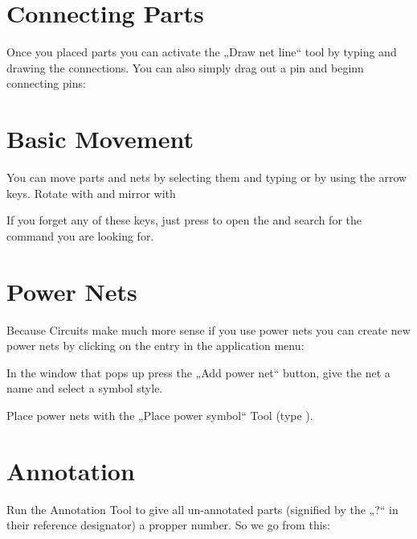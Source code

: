 \documentclass[letterpaper,10pt,czech]{sphinxmanual}
\begin{document}
\noindent{}


\section{Connecting Parts}
\label{\detokenize{draw-schematic:connecting-parts}}
Once you placed parts you can activate the „Draw net line“ tool by typing  and drawing the connections. You can also simply drag out a pin and beginn connecting pins:

\noindent{}


\section{Basic Movement}
\label{\detokenize{draw-schematic:basic-movement}}
You can move parts and nets by selecting them and typing  or by using the  arrow keys. Rotate with  and mirror with 

If you forget any of these keys, just press  to open the {\hyperref[\detokenize{spacebar-menu::doc}]{}} and search for the command you are looking for.


\section{Power Nets}
\label{\detokenize{draw-schematic:power-nets}}
Because Circuits make much more sense if you use power nets you can create new power nets by clicking on the entry in the application menu:

\noindent{}

In the window that pops up press the „Add power net“ button, give the net a name and select a symbol style.

Place power nets with the „Place power symbol“ Tool (type ).


\section{Annotation}
\label{\detokenize{draw-schematic:annotation}}
Run the Annotation Tool to give all un-annotated parts (signified by the „?“ in their reference designator) a propper number. So we go from this:
\end{document}
